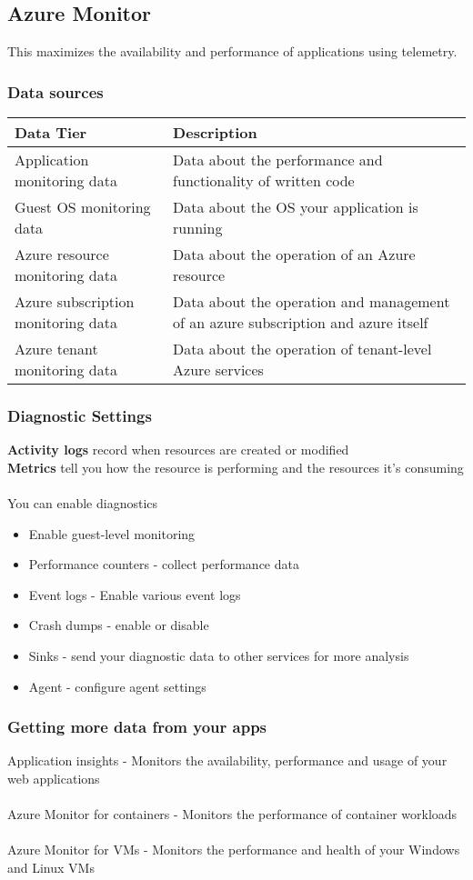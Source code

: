 \documentclass{article}[18pt]
\begin{document}
\subsection{Azure Monitor}
This maximizes the availability and performance of applications using telemetry.
\subsubsection{Data sources}
{\renewcommand{\arraystretch}{2}
	\begin{tabularx}{\textwidth}{L L}
		\textbf{Data Tier}& \textbf{Description}\\
		\hline
		Application monitoring data& Data about the performance and functionality of written code\\
		\hline
		Guest OS monitoring data& Data about the OS your application is running\\
		\hline
		Azure resource monitoring data& Data about the operation of an Azure resource\\
		\hline
		Azure subscription monitoring data& Data about the operation and management of an azure subscription and azure itself\\
		\hline
		Azure tenant monitoring data& Data about the operation of tenant-level Azure services
	\end{tabularx}
}
\subsubsection{Diagnostic Settings}
\textbf{Activity logs} record when resources are created or modified\\
\textbf{Metrics} tell you how the resource is performing and the resources it's consuming\\
\\
You can enable diagnostics
\begin{itemize}
	\item Enable guest-level monitoring
	\item Performance counters - collect performance data
	\item Event logs - Enable various event logs
	\item Crash dumps - enable or disable
	\item Sinks - send your diagnostic data to other services for more analysis
	\item Agent - configure agent settings
\end{itemize}
\subsubsection{Getting more data from your apps}
Application insights - Monitors the availability, performance and usage of your web applications\\
\\
Azure Monitor for containers - Monitors the performance of container workloads\\
\\
Azure Monitor for VMs - Monitors the performance and health of your Windows and Linux VMs
\end{document}
